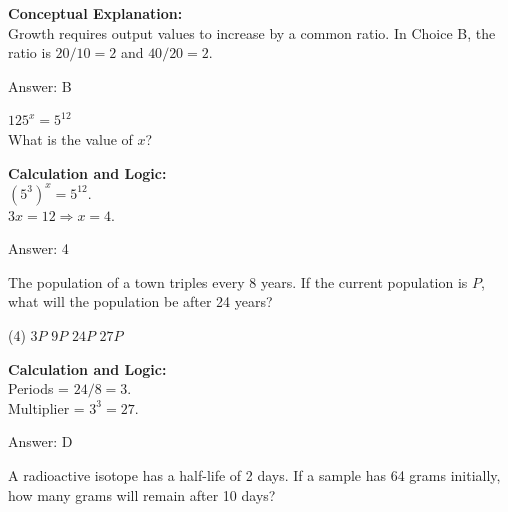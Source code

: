 \documentclass[11pt,paper=a4,answers]{exam}
\begin{document}
\begin{questions}
\begin{solution}
\textbf{Conceptual Explanation:} \\
Growth requires output values to increase by a common ratio. In Choice B, the ratio is $20/10 = 2$ and $40/20 = 2$.

\vspace{25pt}

Answer: \colorbox{yellow!100}{B}
\end{solution}

\vspace{40pt}

\question
$125^x = 5^{12}$ \\
What is the value of $x$?

\begin{solution}
\textbf{Calculation and Logic:} \\
$(5^3)^x = 5^{12}$. \\
$3x = 12 \Rightarrow x = 4$.

\vspace{25pt}

Answer: \colorbox{yellow!100}{4}
\end{solution}

\vspace{40pt}

\question
The population of a town triples every 8 years. If the current population is $P$, what will the population be after 24 years?
\begin{tasks}(4)
    \task $3P$
    \task $9P$
    \task $24P$
    \task $27P$
\end{tasks}

\begin{solution}
\textbf{Calculation and Logic:} \\
Periods = $24 / 8 = 3$. \\
Multiplier = $3^3 = 27$.

\vspace{25pt}

Answer: \colorbox{yellow!100}{D}
\end{solution}

\vspace{40pt}

\question
A radioactive isotope has a half-life of 2 days. If a sample has 64 grams initially, how many grams will remain after 10 days?


\end{questions}
\end{document}
